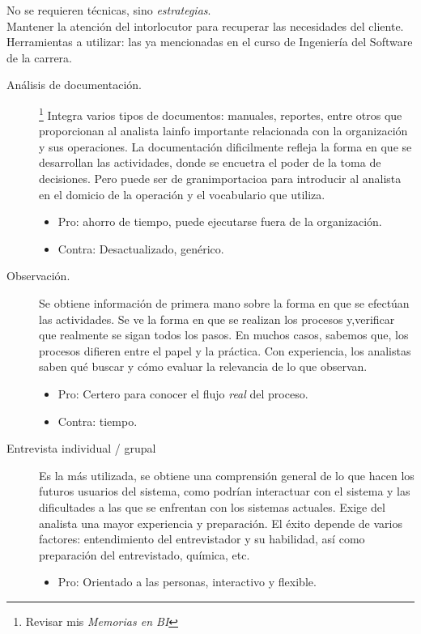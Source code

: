 \documentclass[12pt]{article} %
\begin{document}
No se requieren técnicas, sino \emph{estrategias}.\\

Mantener la atención del intorlocutor para recuperar las necesidades del cliente. Herramientas a utilizar: las ya mencionadas en el curso de Ingeniería del Software de la carrera.\\

\begin{description}
\item[Análisis de documentación.]\footnote{Revisar mis \emph{Memorias en BI}} Integra varios tipos de documentos: manuales, reportes, entre otros que proporcionan al analista lainfo importante relacionada con la organización y sus operaciones. La documentación dificilmente refleja la forma en que se desarrollan las actividades, donde se encuetra el poder de la toma de decisiones. Pero puede ser de granimportacioa para introducir al analista en el domicio de la operación y el vocabulario que utiliza.
\begin{itemize}
\item Pro: ahorro de tiempo, puede ejecutarse fuera de la organización.
\item Contra: Desactualizado, genérico.
\end{itemize}
\item[Observación.] Se obtiene información de primera mano sobre la forma en que se efectúan las actividades. Se ve la forma en que se realizan los procesos y,verificar que realmente se sigan todos los pasos. En muchos casos, sabemos que, los procesos difieren entre el papel y la práctica. Con experiencia, los analistas saben qué buscar y cómo evaluar la relevancia de lo que observan.
\begin{itemize}
\item Pro: Certero para conocer el flujo \emph{real} del proceso.
\item Contra: tiempo.
\end{itemize}
\item[Entrevista individual / grupal] Es la más utilizada, se obtiene una comprensión general de lo que hacen los futuros usuarios del sistema, como podrían interactuar con el sistema y las dificultades a las que se enfrentan con los sistemas actuales. Exige del analista una mayor experiencia y preparación. El éxito depende de varios factores: entendimiento del entrevistador y su habilidad, así como preparación del entrevistado, química, etc.
\begin{itemize}
\item Pro: Orientado a las personas, interactivo y flexible.

\end{itemize}
\end{description}
\end{document}
